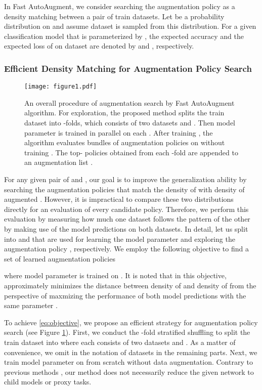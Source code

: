 \documentclass{article}
\begin{document}
In Fast AutoAugment, we consider searching the augmentation policy as a density matching between a pair of train datasets. Let  be a probability distribution on 
and assume dataset  is sampled from this distribution. For a given classification model  that is parameterized by , the expected accuracy and the expected loss of   
on dataset  are denoted by  and , respectively. 


\subsubsection{Efficient Density Matching for Augmentation Policy  Search}
\label{subsubsec:FAA}

 \begin{figure}
     \centering
     \texttt{[image: figure1.pdf]}

     \caption{An overall procedure of augmentation search by Fast AutoAugment algorithm. For exploration, the proposed method splits the train dataset  into -folds, which consists of two datasets  and . Then model parameter  is trained in parallel on each . After training , the algorithm evaluates  bundles of augmentation policies on  without training . The top- policies obtained from each -fold are appended to an augmentation list .}
     \label{fig:FAA}
 \end{figure}



For any given pair of  and , our goal is to improve the generalization ability by searching the augmentation policies that match the density of  with density of augmented . However, it is impractical to compare these two distributions directly for an evaluation of every candidate policy. Therefore, we perform this evaluation by measuring how much one dataset follows the pattern of the other by making use of the model predictions on both datasets. In detail, let us split  into  and  that are used for learning the model parameter  and exploring the augmentation policy , respectively. We employ the following objective to find a set of learned augmentation policies

where model parameter  is trained on . It is noted that in this objective,  approximately minimizes the distance between density of  and density of  from the perspective of maxmizing the performance of both model predictions with the same parameter .

To achieve \eqref{eq:objective}, we propose an efficient strategy for augmentation policy search (see Figure \ref{fig:FAA}). First, we conduct the -fold stratified shuffling \cite{shahrokh2013effect} to split the train dataset into  where each  consists of two datasets  and . As a matter of convenience, we omit  in the notation of datasets in the remaining parts. Next, we train model parameter  on  from scratch without data augmentation. Contrary to previous methods \cite{cubuk2018autoaugment, ho2019pba}, our method does not necessarily reduce the given network to child models or proxy tasks. 
\end{document}
